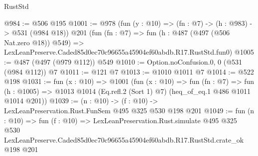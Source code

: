 \begin{lexlean}{RustStd}
\begin{coremodule}
@984 := @506 @195
@1001 := @978
    (fun (y : @10) => (fn : @7) -> (h : @983) -> @531 (@984 @18))
    @201
    (fun (fn : @7) =>
    fun (h : @487 (@497 (@506 Nat.zero @18)) @549) =>
    LexLeanPreserve.Caded85d0ec70c96655a45904ef60abdb.R17.RustStd.fun0)
@1005 := @487 (@497 (@979 @112)) @549
@1010 := Option.noConfusion.{0, 0} (@531 (@984 @112)) @7
@1011 := @121 @7
@1013 := @1010 @1011 @7
@1014 := @522 @198
@1031 := fun (x : @10) =>
  @1001
    (fun (x : @10) =>
    fun (fn : @7) =>
    fun (h : @1005) => @1013 @1014 (Eq.refl.{2} (Sort 1) @7) (heq_of_eq.{1} @486 @1011 @1014 @201))
@1039 := (n : @10) -> (f : @10) -> LexLeanPreservation.Rust.FunSem @495 @325 @530 @198 @201
@1049 := fun (n : @10) =>
  fun (f : @10) =>
  LexLeanPreservation.Rust.simulate
    @495
    @325
    @530
    LexLeanPreserve.Caded85d0ec70c96655a45904ef60abdb.R17.RustStd.crate_ok
    @198
    @201
\end{coremodule}
\end{lexlean}
